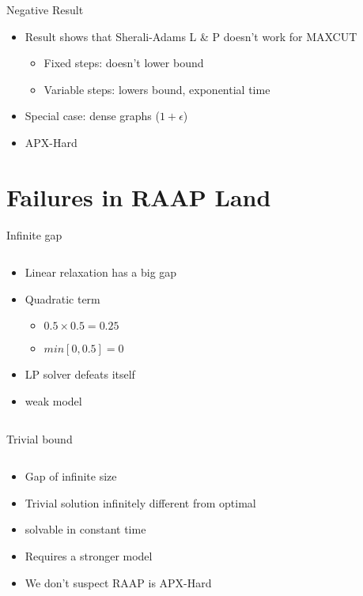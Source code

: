 \documentclass{beamer}
\begin{document}
\begin{frame}{Negative Result}
\begin{itemize}
	\item Result shows that Sherali-Adams L \& P doesn't work for MAXCUT \cite{fer07}
	\begin{itemize}
		\item Fixed steps: doesn't lower bound
		\item Variable steps: lowers bound, exponential time
	\end{itemize}
	\item Special case: dense graphs ($1 + \epsilon$)
	\item APX-Hard
\end{itemize}
\end{frame}

\section{Failures in RAAP Land}

\begin{frame}{Infinite gap}
\begin{columns}
\begin{column}{6cm}
\begin{itemize}
	\item Linear relaxation has a big gap
	\item Quadratic term
	\begin{itemize}
		\item $0.5 \times 0.5 = 0.25$
		\item $min[0, 0.5] = 0$
	\end{itemize}
	\item LP solver defeats itself
	\item weak model
\end{itemize}
\end{column}
\begin{column}{4cm}
\end{column}
\end{columns}
\end{frame}

\begin{frame}{Trivial bound}
\begin{columns}
\begin{column}{6cm}
\begin{itemize}
	\item Gap of infinite size
	\item Trivial solution infinitely different from optimal
	\item solvable in constant time
	\item Requires a stronger model
	\item We don't suspect RAAP is APX-Hard
\end{itemize}
\end{column}
\begin{column}{4cm}
\end{column}
\end{columns}
\end{frame}
\end{document}

